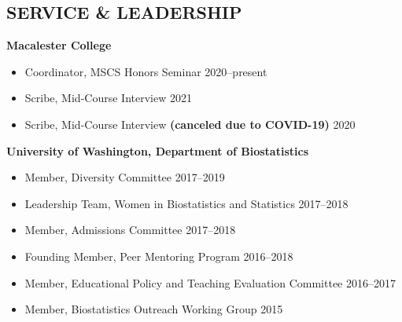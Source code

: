 \documentclass[margin]{res}
\begin{document}
\begin{resume}
\section{SERVICE \& LEADERSHIP}  
\textbf{Macalester College}
	\begin{itemize} \itemsep -2pt
	\item Coordinator, MSCS Honors Seminar \hfill 2020--present
	\item Scribe, Mid-Course Interview \hfill 2021
	\item Scribe, Mid-Course Interview \textbf{(canceled due to COVID-19)}  \hfill 2020
	\end{itemize}
	

\textbf{University of Washington, Department of Biostatistics}
			\begin{itemize} \itemsep -2pt
			\item Member, Diversity Committee \hfill 2017--2019
			\item Leadership Team, Women in Biostatistics and Statistics \hfill 2017--2018
			\item Member, Admissions Committee \hfill 2017--2018
			\item Founding Member, Peer Mentoring Program \hfill 2016--2018
			\item Member, Educational Policy and Teaching Evaluation Committee \hfill 2016--2017
			\item Member, Biostatistics Outreach Working Group \hfill 2015
			\end{itemize}


\end{resume}
\end{document}

